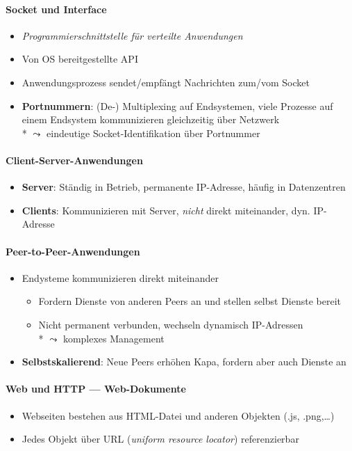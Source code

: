 \paragraph{Socket und Interface}
\begin{itemize}
  \item \emph{Programmierschnittstelle für verteilte Anwendungen}
  \item Von OS bereitgestellte API
  \item Anwendungsprozess sendet/empfängt Nachrichten zum/vom Socket
  \item \textbf{Portnummern}: (De-) Multiplexing auf Endsystemen, viele Prozesse auf einem Endsystem kommunizieren gleichzeitig über Netzwerk \\* \( \leadsto \) eindeutige Socket-Identifikation über Portnummer
\end{itemize}

\paragraph{Client-Server-Anwendungen}
\begin{itemize}
  \item \textbf{Server}: Ständig in Betrieb, permanente IP-Adresse, häufig in Datenzentren
  \item \textbf{Clients}: Kommunizieren mit Server, \emph{nicht} direkt miteinander, dyn. IP-Adresse
\end{itemize}

\paragraph{Peer-to-Peer-Anwendungen}
\begin{itemize}
  \item Endysteme kommunizieren direkt miteinander
  \begin{itemize}
    \item Fordern Dienste von anderen Peers an und stellen selbst Dienste bereit
    \item Nicht permanent verbunden, wechseln dynamisch IP-Adressen \\* \( \leadsto \) komplexes Management
  \end{itemize}
  \item \textbf{Selbstskalierend}: Neue Peers erhöhen Kapa, fordern aber auch Dienste an
\end{itemize}

\paragraph{Web und HTTP --- Web-Dokumente}
\begin{itemize}
  \item Webseiten bestehen aus HTML-Datei und anderen Objekten (.js, .png,\dots)
  \item Jedes Objekt über URL (\emph{uniform resource locator}) referenzierbar
\end{itemize}

